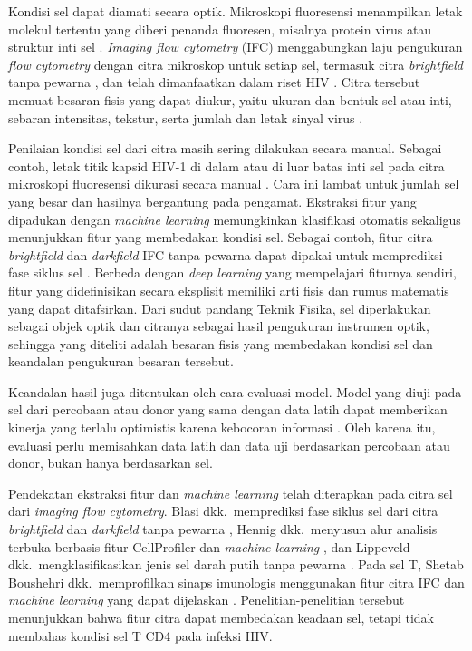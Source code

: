 Kondisi sel dapat diamati secara optik. Mikroskopi fluoresensi menampilkan letak molekul tertentu yang diberi penanda fluoresen, misalnya protein virus atau struktur inti sel \cite{lichtman2005fluorescence}. \textit{Imaging flow cytometry} (IFC) menggabungkan laju pengukuran \textit{flow cytometry} dengan citra mikroskop untuk setiap sel, termasuk citra \textit{brightfield} tanpa pewarna \cite{basiji2007ifc,barteneva2012ifc}, dan telah dimanfaatkan dalam riset HIV \cite{elfimov2025ifchiv}. Citra tersebut memuat besaran fisis yang dapat diukur, yaitu ukuran dan bentuk sel atau inti, sebaran intensitas, tekstur, serta jumlah dan letak sinyal virus \cite{caicedo2017profiling}.

Penilaian kondisi sel dari citra masih sering dilakukan secara manual. Sebagai contoh, letak titik kapsid HIV-1 di dalam atau di luar batas inti sel pada citra mikroskopi fluoresensi dikurasi secara manual \cite{ananth2024spatial}. Cara ini lambat untuk jumlah sel yang besar dan hasilnya bergantung pada pengamat. Ekstraksi fitur yang dipadukan dengan \textit{machine learning} memungkinkan klasifikasi otomatis sekaligus menunjukkan fitur yang membedakan kondisi sel. Sebagai contoh, fitur citra \textit{brightfield} dan \textit{darkfield} IFC tanpa pewarna dapat dipakai untuk memprediksi fase siklus sel \cite{blasi2016labelfree}. Berbeda dengan \textit{deep learning} yang mempelajari fiturnya sendiri, fitur yang didefinisikan secara eksplisit memiliki arti fisis dan rumus matematis yang dapat ditafsirkan. Dari sudut pandang Teknik Fisika, sel diperlakukan sebagai objek optik dan citranya sebagai hasil pengukuran instrumen optik, sehingga yang diteliti adalah besaran fisis yang membedakan kondisi sel dan keandalan pengukuran besaran tersebut.

Keandalan hasil juga ditentukan oleh cara evaluasi model. Model yang diuji pada sel dari percobaan atau donor yang sama dengan data latih dapat memberikan kinerja yang terlalu optimistis karena kebocoran informasi \cite{kapoor2023leakage}. Oleh karena itu, evaluasi perlu memisahkan data latih dan data uji berdasarkan percobaan atau donor, bukan hanya berdasarkan sel.

Pendekatan ekstraksi fitur dan \textit{machine learning} telah diterapkan pada citra sel dari \textit{imaging flow cytometry}. Blasi dkk.\ memprediksi fase siklus sel dari citra \textit{brightfield} dan \textit{darkfield} tanpa pewarna \cite{blasi2016labelfree}, Hennig dkk.\ menyusun alur analisis terbuka berbasis fitur CellProfiler dan \textit{machine learning} \cite{hennig2017ifcml}, dan Lippeveld dkk.\ mengklasifikasikan jenis sel darah putih tanpa pewarna \cite{lippeveld2020wbc}. Pada sel T, Shetab Boushehri dkk.\ memprofilkan sinaps imunologis menggunakan fitur citra IFC dan \textit{machine learning} yang dapat dijelaskan \cite{shetab2023scifai}. Penelitian-penelitian tersebut menunjukkan bahwa fitur citra dapat membedakan keadaan sel, tetapi tidak membahas kondisi sel T CD4 pada infeksi HIV.

